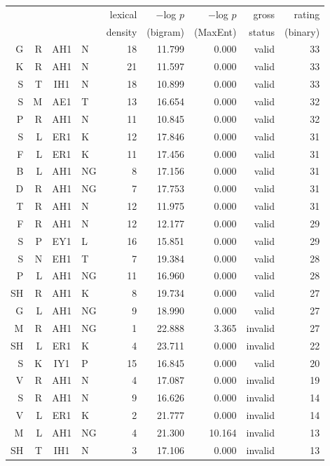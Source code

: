 \documentclass[12pt]{article}
\begin{document}
\begin{longtable}{r@{ }r@{ }c@{ }l@{ } rrrrr}
\toprule
  &   &    &     & lexical & $-$log $p$ & $-$log $p$ & gross  & rating   \\
  &   &    &     & density & (bigram)   & (MaxEnt)   & status & (binary) \\
\midrule 
 G & R & AH1 & N & 18 & 11.799 & 0.000 &   valid & 33 \\
 K & R & AH1 & N & 21 & 11.597 & 0.000 &   valid & 33 \\
 S & T & IH1 & N & 18 & 10.899 & 0.000 &   valid & 33 \\
 S & M & AE1 & T & 13 & 16.654 & 0.000 &   valid & 32 \\
 P & R & AH1 & N & 11 & 10.845 & 0.000 &   valid & 32 \\
 S & L & ER1 & K & 12 & 17.846 & 0.000 &   valid & 31 \\
 F & L & ER1 & K & 11 & 17.456 & 0.000 &   valid & 31 \\
 B & L & AH1 & NG & 8 & 17.156 & 0.000 &   valid & 31 \\
 D & R & AH1 & NG & 7 & 17.753 & 0.000 &   valid & 31 \\
 T & R & AH1 & N & 12 & 11.975 & 0.000 &   valid & 31 \\
 F & R & AH1 & N & 12 & 12.177 & 0.000 &   valid & 29 \\
 S & P & EY1 & L & 16 & 15.851 & 0.000 &   valid & 29 \\
 S & N & EH1 & T & 7 & 19.384 & 0.000 &   valid & 28 \\
 P & L & AH1 & NG & 11 & 16.960 & 0.000 &   valid & 28 \\
SH & R & AH1 & K & 8 & 19.734 & 0.000 &   valid & 27 \\
 G & L & AH1 & NG & 9 & 18.990 & 0.000 &   valid & 27 \\
 M & R & AH1 & NG & 1 & 22.888 & 3.365 & invalid & 27 \\
SH & L & ER1 & K & 4 & 23.711 &  0.000 & invalid & 22 \\
 S & K & IY1 & P & 15 & 16.845 & 0.000 &   valid & 20 \\
 V & R & AH1 & N & 4 & 17.087 &  0.000 & invalid & 19 \\
 S & R & AH1 & N & 9 & 16.626 &  0.000 & invalid & 14 \\
 V & L & ER1 & K & 2 & 21.777 &  0.000 & invalid & 14 \\
 M & L & AH1 & NG & 4 & 21.300 & 10.164 & invalid & 13 \\
SH & T & IH1 & N & 3 & 17.106 & 0.000 & invalid & 13 \\

\end{longtable}
\end{document}
